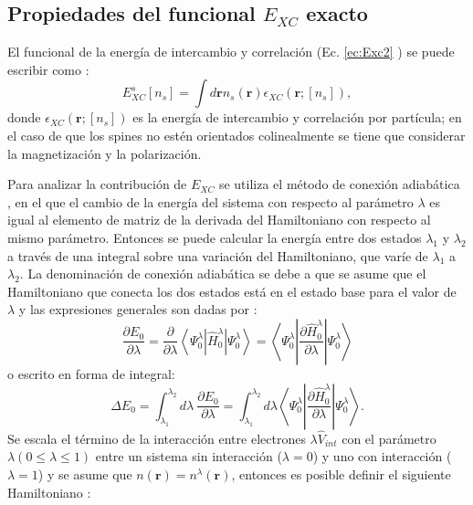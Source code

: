    \subsection{Propiedades del funcional $E_{XC} $ exacto } \label{susec:exXC}
   El funcional de la energ\'ia de intercambio y correlaci\'on (Ec. \ref{ec:Exc2} )  se puede escribir como \cite{MB-2015}:
   \begin{equation}
   E_{XC}^s [n_s] = \int d \pmb{r} n_s (\pmb{r}) \epsilon_{XC} (\pmb{r}; [n_s]) \label{ec:enGenXCf},
   \end{equation} 
   donde $ \epsilon_{XC} (\pmb{r}; [n_s])$ es la energ\'ia de intercambio y correlaci\'on por part\'icula; en el caso de que los spines no est\'en orientados colinealmente se tiene que considerar la magnetizaci\'on y la polarizaci\'on.
   \newline
   \par Para analizar la contribuci\'on de $E_{XC} $ se utiliza el m\'etodo de conexi\'on adiab\'atica \cite{PhysRevA.29.1648}, en el que el cambio de la energ\'ia del sistema con respecto al par\'ametro $\lambda$ es igual al elemento de matriz de la derivada del Hamiltoniano con respecto al mismo par\'ametro. Entonces se puede calcular la energ\'ia entre dos estados $\lambda_1$ y $\lambda_2$ a través de una integral sobre una variaci\'on  del Hamiltoniano, que var\'ie de  $\lambda_1$ a $\lambda_2$. La denominaci\'on  de conexi\'on adiab\'atica se debe a que se asume que el Hamiltoniano que conecta los dos estados est\'a en el estado base para el valor de $\lambda$ y las expresiones generales son  dadas por \cite{Martin-2004, PhysRevA.29.1648}:
   \begin{equation}
   \frac{\partial E_0}{\partial \lambda} = \frac{\partial}{\partial \lambda} \left \langle \Psi_0^{\lambda} \left | \hat{H}_0 ^{\lambda} \right |  \Psi_0^{\lambda} \right \rangle = \left \langle \Psi_0^{\lambda} \left | \frac{\partial \hat{H}_0 ^{\lambda}}{\partial \lambda} \right |  \Psi_0^{\lambda} \right \rangle \label{ec:adAproxderivada}
   \end{equation}  
   o escrito en forma de integral:
   \begin{equation}
   \Delta E_0 = \int_{\lambda_1}^{\lambda_2} d \lambda~ \frac{\partial E_0}{\partial \lambda} = \int_{\lambda_1}^{\lambda_2} d \lambda \left \langle \Psi_0^{\lambda} \left | \frac{\partial \hat{H}_0 ^{\lambda}}{\partial \lambda}  \right |  \Psi_0^{\lambda} \right \rangle \label{ec:adAproxInt}.
   \end{equation}
   Se  escala el t\'ermino de la interacci\'on entre electrones $\lambda \hat{V}_{int}$ con el par\'ametro $\lambda (0 \le \lambda \le 1)$ entre un sistema sin interacci\'on ($\lambda=0$) y uno con interacci\'on ($\lambda=1$) y  se asume que $n(\pmb{r})= n^{\lambda} (\pmb{r})$, entonces es posible definir el siguiente Hamiltoniano \cite{Harris1974TheSE}: 
